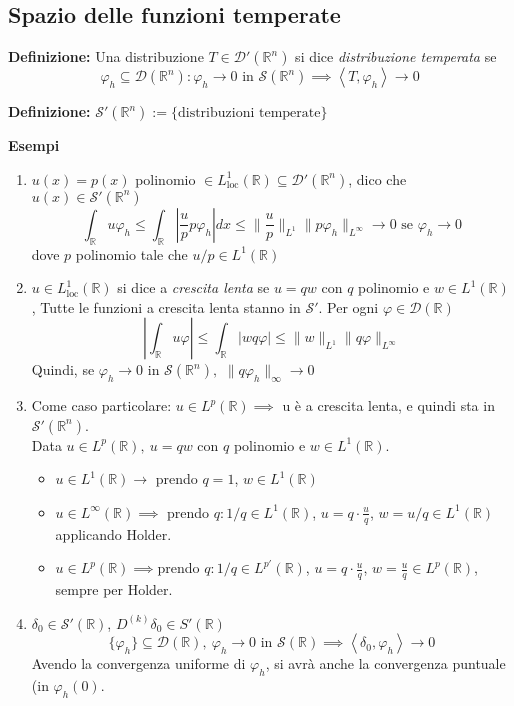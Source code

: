 \documentclass[a4paper]{article}
\newcommand{\R}{\mathbb{R}}
\begin{document}
\subsection{Spazio delle funzioni temperate}

\begin{tcolorbox}
	\textbf{Definizione: }Una distribuzione $T \in \mathcal D'(\R^n)$ si dice \emph{distribuzione temperata} se 
	\[\varphi_h \subseteq  \mathcal D(\R^n):\varphi_h\to 0\text{ in }\mathcal S(\R^n)\implies \left< T,\varphi_h \right> \to 0\]
\end{tcolorbox}
\begin{tcolorbox}
	\textbf{Definizione: }$\mathcal S'(\R^n):= \{\text{distribuzioni temperate}\} $
\end{tcolorbox}
\textbf{Esempi} 
\begin{enumerate}
	\item $u(x)=p(x)$ polinomio $\in L^1_{\text{loc}}(\R)\subseteq  \mathcal D'(\R^n)$, dico che $u(x)\in \mathcal S'(\R^n)$ 
		\[\int_{\R}^{} u\varphi_h \le  \int_{\R}^{} |\frac{u}{p}p\varphi_h| dx\le \|\frac{u}{p}\|_{L^1}\|p\varphi_h\|_{L^\infty}\to 0\text{ se }\varphi_h\to 0\]
		dove $p$ polinomio tale che $u / p \in L^{1}(\R)$ 
	\item $u\in L^1_{\text{loc}}(\R)$ si dice a \emph{crescita lenta} se $u=qw$ con $q$ polinomio e $w\in L^{1}(\R)$, Tutte le funzioni a crescita lenta stanno in  $\mathcal S'$. Per ogni $\varphi \in \mathcal D(\R)$ 
		\[|\int_{\R}^{} u\varphi |\le  \int_{\R}^{} |wq\varphi|\le \|w\|_{L^1}\|q\varphi\|_{L^\infty}\]
		Quindi, se $\varphi_h\to 0$ in $\mathcal S(\R^n),$ $\|q\varphi_h\|_{\infty}\to 0$
	\item Come caso particolare: $u\in L^{p}(\R)\implies $ u è a crescita lenta, e quindi sta in $\mathcal S'(\R^n)$.\\
		Data $u\in L^{p}(\R), \ u=qw$ con $q$ polinomio e $w\in L^{1}(\R)$.
		\begin{itemize}
			\item $u\in L^{1}(\R)\rightarrow $ prendo $q=1$, $w \in L^1(\R)$ 
			\item $u\in L^{\infty}(\R)\implies $ prendo $q:1 / q \in L^{1}(\R)$, $u=q\cdot \frac{u}{q}$, $w=u / q \in L^{1}(\R)$ applicando Holder.
			\item $u \in L^{p}(\R)\implies $prendo $q:1 / q \in L^{p'}(\R)$, $u=q\cdot \frac{u}{q}$, $w=\frac{u}{q}\in L^{p}(\R)$, sempre per Holder.
		\end{itemize}
	\item $\delta_0\in \mathcal S'(\R)$, $D^{(k)}\delta_0\in S'(\R)$
		\[\{\varphi_h\} \subseteq  \mathcal D(\R),\ \varphi_h\to 0\text{ in }\mathcal S(\R)\implies \left< \delta_0,\varphi_h \right> \to 0\]
		Avendo la convergenza uniforme di $\varphi_h$, si avrà anche la convergenza puntuale (in $\varphi_h(0)$.

\end{enumerate}
\end{document}
